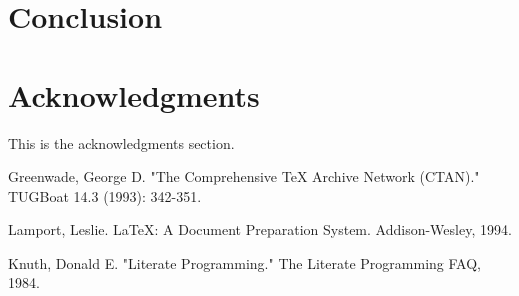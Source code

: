 \documentclass[5p,twocolumn]{elsarticle} %
\begin{document}
    \section{Conclusion}
    \blindtext %

    \section*{Acknowledgments}
    This is the acknowledgments section. %

    \begin{thebibliography}{99} %

         Greenwade, George D. "The Comprehensive TeX Archive Network (CTAN)." TUGBoat 14.3 (1993): 342-351.

         Lamport, Leslie. LaTeX: A Document Preparation System. Addison-Wesley, 1994.

         Knuth, Donald E. "Literate Programming." The Literate Programming FAQ, 1984.

    \end{thebibliography}
\end{document}
